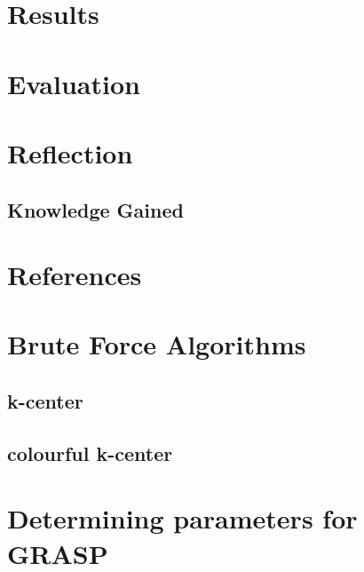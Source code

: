 \documentclass{article}
\begin{document}
\section{Results}\label{section:results}

\section{Evaluation}\label{section:evaluation}

\section{Reflection}
\subsection{Knowledge Gained}

\newpage
\section{References}
\printbibliography[heading=none]

\appendix
\section{Brute Force Algorithms}
\subsection{k-center}
\label{brute-force-k-center}

\subsection{colourful k-center}

\section{Determining parameters for GRASP}\label{appendix:grasp_param}
\end{document}
